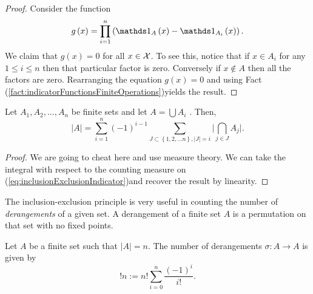 \begin{proof}
Consider the function 
\[
g\left(x\right)=\prod_{i=1}^{n}\left(\indicate_{A}\left(x\right)-\indicate_{A_{i}}\left(x\right)\right).
\]
We claim that $g\left(x\right)=0$ for all $x\in\mathcal{X}$. To see this,
notice that if $x\in A_{i}$ for any $1\leq i\leq n$ then that particular
factor is zero. Conversely if $x\notin A$ then all the factors are
zero. Rearranging the equation $g\left(x\right)=0$ and using Fact
(\ref{fact:indicatorFunctionsFiniteOperations})yields the result.
\end{proof}
\begin{thm}
\label{thm:inclusionExclusionCardinality}Let $A_{1},A_{2},\ldots,A_{n}$
be finite sets and let $A=\bigcup A_{i}$ . Then,
\[
\lvert A\rvert=\sum_{i=1}^{n}\left(-1\right)^{i-1}\sum_{J\subset\left\{ 1,2,\ldots n\right\} ,\lvert J\rvert=i}\lvert\bigcap_{j\in J}A_{j}\rvert.
\]
\end{thm}

\begin{proof}
We are going to cheat here and use measure theory. We can take the
integral with respect to the counting measure on (\ref{eq:inclusionExclusionIndicator})and
recover the result by linearity.
\end{proof}
The inclusion-exclusion principle is very useful in counting the number
of \emph{derangements} of a given set. A derangement of a finite set
$A$ is a permutation on that set with no fixed points.
\begin{prop}
\label{prop:numDerangements}Let $A$ be a finite set such that $\lvert A\rvert=n.$
The number of derangements $\sigma:A\to A$ is given by 
\[
!n:=n!\sum_{i=0}^{n}\frac{\left(-1\right)^{i}}{i!}.
\]
\end{prop}

